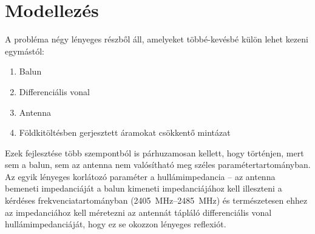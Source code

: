 \chapter{Modellezés}
A probléma négy lényeges részből áll, amelyeket többé-kevésbé külön lehet kezeni egymástól:
\begin{enumerate}
	\item Balun
	\item Differenciális vonal
	\item Antenna
	\item Földkitöltésben gerjesztett áramokat csökkentő mintázat
\end{enumerate}
\par Ezek fejlesztése több szempontból is párhuzamosan kellett, hogy történjen, mert sem a balun, sem az antenna nem valósítható meg széles paramétertartományban. Az egyik lényeges korlátozó paraméter a hullámimpedancia -- az antenna bemeneti impedanciáját a balun kimeneti impedanciájához kell illeszteni a kérdéses frekvenciatartományban (\SIrange{2405}{2485}{MHz}) és természetesen ehhez az impedanciához kell méretezni az antennát tápláló differenciális vonal hullámimpedanciáját, hogy ez se okozzon lényeges reflexiót.
